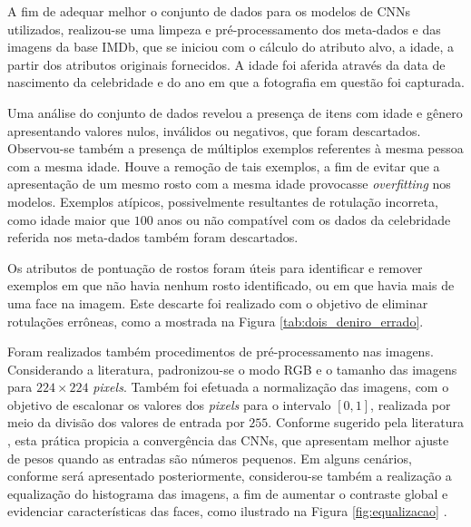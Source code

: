 A fim de adequar melhor o conjunto de dados para os modelos de CNNs utilizados, realizou-se uma limpeza e pré-processamento dos meta-dados e das imagens da base IMDb, que se iniciou com o cálculo do atributo alvo, a idade, a partir dos atributos originais fornecidos. A idade foi aferida através da data de nascimento da celebridade e do ano em que a fotografia em questão foi capturada.

Uma análise do conjunto de dados revelou a presença de itens com idade e gênero apresentando valores nulos, inválidos ou negativos, que foram descartados. Observou-se também a presença de múltiplos exemplos referentes à mesma pessoa com a mesma idade. Houve a remoção de tais exemplos, a fim de evitar que a apresentação de um mesmo rosto com a mesma idade provocasse \emph{overfitting} nos modelos. Exemplos atípicos, possivelmente resultantes de rotulação incorreta, como idade maior que $100$ anos ou não compatível com os dados da celebridade referida nos meta-dados também foram descartados.

Os atributos de pontuação de rostos foram úteis para identificar e remover exemplos em que não havia nenhum rosto identificado, ou em que havia mais de uma face na imagem. Este descarte foi realizado com o objetivo de eliminar rotulações errôneas, como a mostrada na Figura \ref{tab:dois_deniro_errado}.

Foram realizados também procedimentos de pré-processamento nas imagens. Considerando a literatura, padronizou-se o modo RGB e o tamanho das imagens para $224 \times 224$ \emph{pixels}.  Também foi efetuada a normalização das imagens, com o objetivo de escalonar os valores dos \emph{pixels} para o intervalo $[0,1]$, realizada por meio da divisão dos valores de entrada por  $255$. Conforme sugerido pela literatura \cite[vide Seção 5.2.4]{chollet2017deep}, esta prática propicia a convergência das CNNs, que apresentam melhor ajuste de pesos quando as entradas são números pequenos. Em alguns cenários, conforme será apresentado posteriormente, considerou-se também a realização a equalização do histograma das imagens, a fim de aumentar o contraste global e evidenciar características das faces, como ilustrado na Figura \ref{fig:equalizacao} \cite{acharya2005image}.

